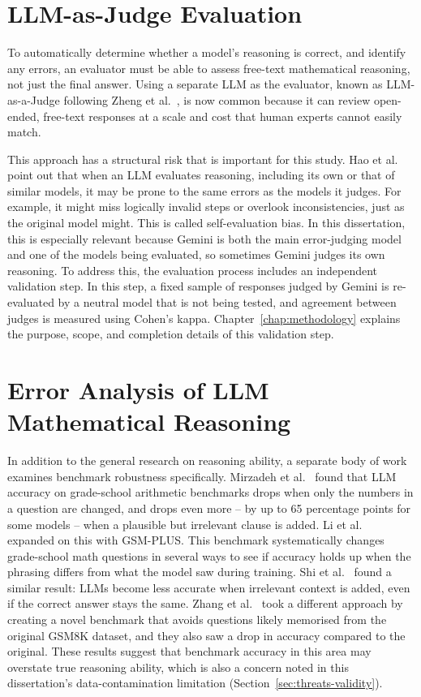 \section{LLM-as-Judge Evaluation}

To automatically determine whether a model's reasoning is correct, and
identify any errors, an evaluator must be able to assess free-text
mathematical reasoning, not just the final answer. Using a separate LLM as
the evaluator, known as LLM-as-a-Judge following Zheng et
al.~\cite{zheng2023judging}, is now common because it can review
open-ended, free-text responses at a scale and cost that human experts
cannot easily match.

This approach has a structural risk that is important for this study. Hao
et al.~\cite{hao2024autorace} point out that when an LLM evaluates
reasoning, including its own or that of similar models, it may be prone to
the same errors as the models it judges. For example, it might miss
logically invalid steps or overlook inconsistencies, just as the original
model might. This is called self-evaluation bias. In this dissertation,
this is especially relevant because Gemini is both the main error-judging
model and one of the models being evaluated, so sometimes Gemini judges
its own reasoning. To address this, the evaluation process includes an
independent validation step. In this step, a fixed sample of responses
judged by Gemini is re-evaluated by a neutral model that is not being
tested, and agreement between judges is measured using Cohen's kappa.
Chapter~\ref{chap:methodology} explains the purpose, scope, and completion
details of this validation step.

\section{Error Analysis of LLM Mathematical Reasoning}

In addition to the general research on reasoning ability, a separate
body of work examines benchmark robustness specifically. Mirzadeh et
al.~\cite{mirzadeh2025symbolic} found that LLM accuracy on grade-school
arithmetic benchmarks drops when only the numbers in a question are
changed, and drops even more -- by up to 65 percentage points for some
models -- when a plausible but irrelevant clause is added. Li et
al.~\cite{li2024gsmplus} expanded on this with GSM-PLUS. This benchmark
systematically changes grade-school math questions in several ways to
see if accuracy holds up when the phrasing differs from what the model
saw during training. Shi et al.~\cite{shi2023distracted} found a similar
result: LLMs become less accurate when irrelevant context is added,
even if the correct answer stays the same. Zhang et
al.~\cite{zhang2024gsm1k} took a different approach by creating a novel
benchmark that avoids questions likely memorised from the original
GSM8K dataset, and they also saw a drop in accuracy compared to the
original. These results suggest that benchmark accuracy in this area
may overstate true reasoning ability, which is also a concern noted in
this dissertation's data-contamination limitation
(Section~\ref{sec:threats-validity}).

